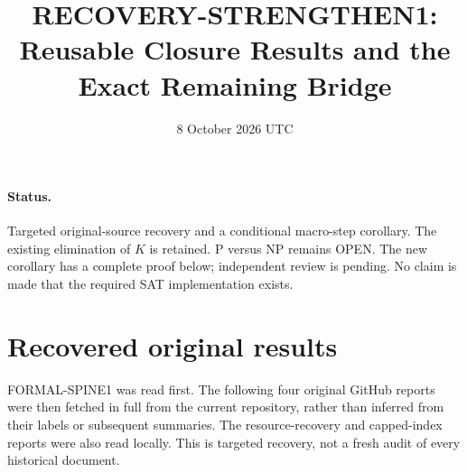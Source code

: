 \documentclass[11pt]{article}
\title{RECOVERY-STRENGTHEN1: Reusable Closure Results and the Exact Remaining Bridge}
\date{8 October 2026 UTC}
\begin{document}
\sloppy\maketitle
\paragraph{Status.} Targeted original-source recovery and a conditional macro-step corollary.
The existing elimination of $K$ is retained. P versus NP remains OPEN.
The new corollary has a complete proof below; independent review is pending.
No claim is made that the required SAT implementation exists.

\section{Recovered original results}
FORMAL-SPINE1 was read first. The following four original GitHub reports were
then fetched in full from the current repository, rather than inferred from
their labels or subsequent summaries. The resource-recovery and capped-index
reports were also read locally. This is targeted recovery, not a fresh audit of
every historical document.
\end{document}
